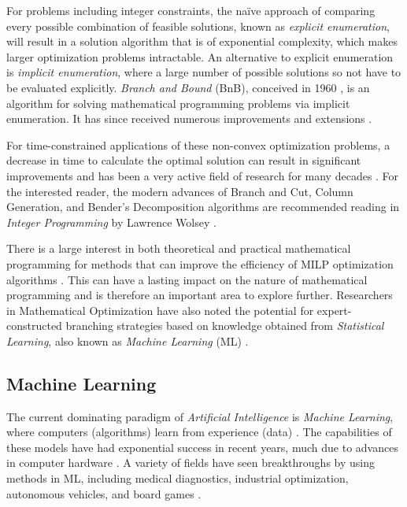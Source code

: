 For problems including integer constraints, the na\"ive approach of comparing every possible combination of feasible solutions, known as \textit{explicit enumeration}, will result in a solution algorithm that is of exponential complexity, which makes larger optimization problems intractable. An alternative to explicit enumeration is \textit{implicit enumeration}, where a large number of possible solutions so not have to be evaluated explicitly. 
\textit{Branch and Bound} (\gls{BnB}), conceived in 1960 \cite{land1960automatic}, is an algorithm for solving mathematical programming problems via implicit enumeration. It has since received numerous improvements and extensions \cite{wolsey2020integer}. 

For time-constrained applications of these non-convex optimization problems, a decrease in time to calculate the optimal solution can result in significant improvements and has been a very active field of research for many decades \cite{wolsey2020integer}. For the interested reader, the modern advances of Branch and Cut, Column Generation, and Bender's Decomposition algorithms are recommended reading in \textit{Integer Programming} by Lawrence Wolsey \cite{wolsey2020integer}.


There is a large interest in both theoretical and practical mathematical programming for methods that can improve the efficiency of \gls{MILP} optimization algorithms \cite{wolsey2020integer}. This can have a lasting impact on the nature of mathematical programming and is therefore an important area to explore further. Researchers in Mathematical Optimization have also noted the potential for expert-constructed branching strategies based on knowledge obtained from \textit{Statistical Learning}, also known as \textit{Machine Learning} (\Gls{ML}) \cite{lodi2017learning}.


\subsection{Machine Learning}

The current dominating paradigm of \textit{Artificial Intelligence} is \textit{Machine Learning}, where computers (algorithms) learn from experience (data) \cite{goodfellow2016deep}. The capabilities of these models have had exponential success in recent years, much due to advances in computer hardware \cite{goodfellow2016deep}. A variety of fields have seen breakthroughs by using methods in \gls{ML}, including medical diagnostics, industrial optimization, autonomous vehicles, and board games \cite{goodfellow2016deep}. 

